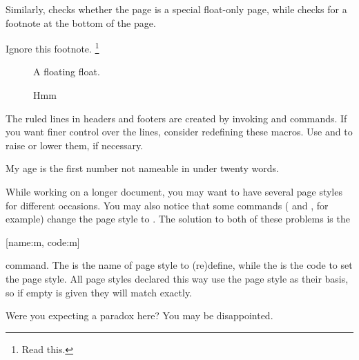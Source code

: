 Similarly,  checks whether
the page is a special float-only page, while  checks for a
footnote at the bottom of the page.
\begin{example}[standalone, paperheight=4cm, to_page=2, vertical_pages]
\geometry{includehead, includefoot, headsep=.5em, footskip=1em} %
\sloppy %
\usepackage{fancyhdr}%
\usepackage{extramarks}%
\pagestyle{fancy}%


\noindent %
Ignore this footnote.%
\footnote{Read this.}
\begin{figure}[t]
  \centering
  A floating float.
  \caption{Hmm}
\end{figure}
\end{example}

The ruled lines in headers and footers are created by invoking 
and  commands. If you want finer control over the lines, consider
redefining these macros. Use  and  to raise
or lower them, if necessary.
\begin{example}[standalone, paperheight=4cm, paperwidth=3.2cm]
\geometry{includehead, includefoot, headsep=.5em, footskip=1em} %
\sloppy %
\usepackage{fancyhdr}%
\usepackage{extramarks}%
\pagestyle{fancy}%
\RenewDocumentCommand{\headrule}{}{
  \rule{0.05\headwidth}{0.2cm}%
  \rule[0.1cm]{0.9\headwidth}{\headrulewidth}%
  \rule{0.05\headwidth}{0.2cm}%
}

\RenewDocumentCommand{\headruleskip}{}{-0.2cm}

\noindent %
My age is the first number not
nameable in under twenty words.
\end{example}

While working on a longer document, you may want to have several page styles for
different occasions. You may also notice that some commands ( and
, for example) change the page style to .
The solution to both of these problems is the
\begin{lscommand}
  [name:m, code:m]
\end{lscommand}
command. The  is the name of page style to (re)define, while the %
 is the code to set the page style. All page styles declared this
way use the  page style as their basis, so if empty  is
given they will match  exactly.
\begin{example}[standalone, paperheight=3cm]
\geometry{includehead, includefoot, headsep=.5em, footskip=1em} %
\sloppy %
\usepackage{fancyhdr}%
\usepackage{extramarks}%
\pagestyle{mine}

Were you expecting a paradox here?
\noindent
You may be disappointed.

\end{example}

